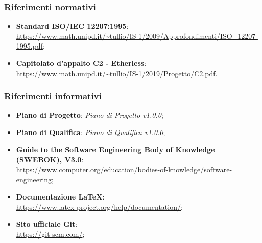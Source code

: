 	\subsubsection{Riferimenti normativi}
	\begin{itemize}
		\item \textbf{Standard ISO/IEC 12207:1995}: \\
		\url{https://www.math.unipd.it/~tullio/IS-1/2009/Approfondimenti/ISO_12207-1995.pdf};
		\item \textbf{Capitolato d'appalto C2 - Etherless}: \\
		\url{https://www.math.unipd.it/~tullio/IS-1/2019/Progetto/C2.pdf}.
	\end{itemize}
	
	
	\subsubsection{Riferimenti informativi}
	\begin{itemize}
		\item \textbf{Piano di Progetto}: \textit{Piano di Progetto v1.0.0};
		\item \textbf{Piano di Qualifica}: \textit{Piano di Qualifica v1.0.0};
		\item \textbf{Guide to the Software Engineering Body of Knowledge (SWEBOK), V3.0}:\\
		\url{https://www.computer.org/education/bodies-of-knowledge/software-engineering};
		\item \textbf{Documentazione LaTeX}: \\
		\url{https://www.latex-project.org/help/documentation/};
		\item \textbf{Sito ufficiale Git}: \\
		\url{https://git-scm.com/};
	\end{itemize}